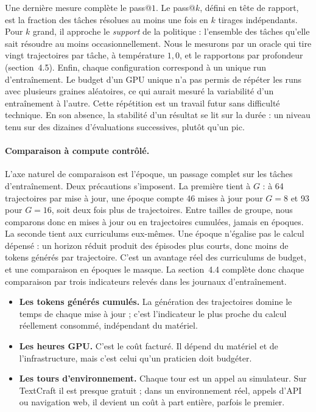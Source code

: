 \documentclass[11pt,a4paper]{article}
\begin{document}
Une dernière mesure complète le pass@$1$. Le pass@$k$, défini en tête de rapport, est la fraction des tâches résolues au moins une fois en $k$ tirages indépendants. Pour $k$ grand, il approche le \emph{support} de la politique : l'ensemble des tâches qu'elle sait résoudre au moins occasionnellement. Nous le mesurons par un oracle qui tire vingt trajectoires par tâche, à température $1{,}0$, et le rapportons par profondeur (section~4.5). Enfin, chaque configuration correspond à un unique run d'entraînement. Le budget d'un GPU unique n'a pas permis de répéter les runs avec plusieurs graines aléatoires, ce qui aurait mesuré la variabilité d'un entraînement à l'autre. Cette répétition est un travail futur sans difficulté technique. En son absence, la stabilité d'un résultat se lit sur la durée : un niveau tenu sur des dizaines d'évaluations successives, plutôt qu'un pic.

\paragraph{Comparaison à compute contrôlé.} L'axe naturel de comparaison est l'époque, un passage complet sur les tâches d'entraînement. Deux précautions s'imposent. La première tient à $G$ : à 64 trajectoires par mise à jour, une époque compte 46 mises à jour pour $G=8$ et 93 pour $G=16$, soit deux fois plus de trajectoires. Entre tailles de groupe, nous comparons donc en mises à jour ou en trajectoires cumulées, jamais en époques. La seconde tient aux curriculums eux-mêmes. Une époque n'égalise pas le calcul dépensé : un horizon réduit produit des épisodes plus courts, donc moins de tokens générés par trajectoire. C'est un avantage réel des curriculums de budget, et une comparaison en époques le masque. La section~4.4 complète donc chaque comparaison par trois indicateurs relevés dans les journaux d'entraînement.

\begin{itemize}
    \item \textbf{Les tokens générés cumulés.} La génération des trajectoires domine le temps de chaque mise à jour ; c'est l'indicateur le plus proche du calcul réellement consommé, indépendant du matériel.
    \item \textbf{Les heures GPU.} C'est le coût facturé. Il dépend du matériel et de l'infrastructure, mais c'est celui qu'un praticien doit budgéter.
    \item \textbf{Les tours d'environnement.} Chaque tour est un appel au simulateur. Sur TextCraft il est presque gratuit ; dans un environnement réel, appels d'API ou navigation web, il devient un coût à part entière, parfois le premier.
\end{itemize}
\end{document}
